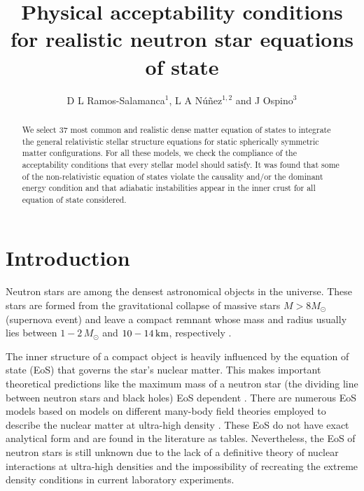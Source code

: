 \documentclass[a4paper]{jpconf} %
\begin{document}
\title{Physical acceptability conditions for realistic neutron star equations of state}

\author{D L Ramos-Salamanca$^{1}$, L A Núñez$^{1,2}$ and J Ospino$^{3}$}

\address{$^1$ Escuela de Física, Universidad Industrial de Santander, Bucaramanga, Colombia}
\address{$^2$ Departamento de Física, Universidad de los Andes, Mérida, Venezuela}
\address{$^3$ Departamento de Matemática Aplicada, Universidad de Salamanca, Salamanca, España}


\begin{abstract}%
We select 37 most common and realistic dense matter equation of states to integrate the general relativistic stellar structure equations for static spherically symmetric matter configurations.  For all these models, we check the compliance of the acceptability conditions that every stellar model should satisfy. It was found that some of the non-relativistic equation of states violate the causality  and/or the dominant energy condition and that adiabatic instabilities appear in the inner crust for all equation of state considered.
\end{abstract}

\section{Introduction}


Neutron stars are among the densest astronomical objects in the universe. These stars are formed from the gravitational collapse of massive stars $M > 8 M_{\odot}$ (supernova event) and leave a compact remnant whose mass and radius usually lies between $1 - 2 \,M_{\odot}$ and $10-14\,\rm{km}$, respectively \cite{HaenselPotekhinYakovlev2007}.

The inner structure of a compact object is heavily influenced by the equation of state (EoS) that governs the star's nuclear matter. This makes important theoretical predictions like the maximum mass of a neutron star (the dividing line between neutron stars and black holes) EoS dependent \cite{OzelFreire2016}. There are numerous EoS models based on models on different many-body field theories employed to describe the nuclear matter at ultra-high density \cite{FiorellaFantina2018}. These EoS do not have exact analytical form and are found in the literature as tables. Nevertheless, the EoS of neutron stars is still unknown due to the lack of a definitive theory of nuclear interactions at ultra-high densities and the impossibility of recreating the extreme density conditions in current laboratory experiments. 
\end{document}
